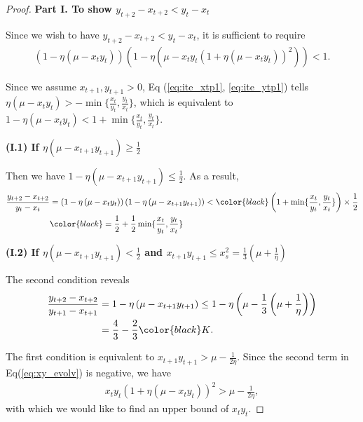 \documentclass{article}
\theoremstyle{plain}
\theoremstyle{remark}
\newcommand{\red}[1]{{\color{black}#1}}
\begin{document}
\begin{proof}
\textbf{Part I. To show $y_{t+2}-x_{t+2}<y_t-x_t$}


Since we wish to have $y_{t+2}-x_{t+2}<y_t-x_t$, it is sufficient to require
\begin{align}
    \left(1-\eta\left(\mu-x_t y_t\right)\right)
    \left(1-\eta\left(\mu-x_t y_t\left(1+\eta\left(\mu-x_t y_t\right)\right)^2\right)\right)<1. \label{eq:xybalance}
\end{align}


\red{
Since we assume $x_{t+1}, y_{t+1}>0$, Eq (\ref{eq:ite_xtp1}, \ref{eq:ite_ytp1}) tells $\eta\left(\mu-x_t y_t\right)>-\min\{\frac{x_t}{y_t}, \frac{y_t}{x_t}\}$, which is equivalent to $1-\eta\left(\mu-x_t y_t\right)<1+\min\{\frac{x_t}{y_t}, \frac{y_t}{x_t}\}$.}

\textbf{(I.1) If $\eta(\mu-x_{t+1}y_{t+1})\ge\frac{1}{2}$}

Then we have $1-\eta(\mu-x_{t+1}y_{t+1})\le\frac{1}{2}$. As a result, 
\begin{align}
    \frac{y_{t+2}-x_{t+2}}{y_t-x_t}&=\left(1-\eta\left(\mu-x_t y_t\right)\right)\left(1-\eta\left(\mu-x_{t+1} y_{t+1}\right)\right)< \red{\left(1+\min\{\frac{x_t}{y_t}, \frac{y_t}{x_t}\}\right)\times\frac{1}{2}} \\
    &\red{=\frac{1}{2}+\frac{1}{2}\min\{\frac{x_t}{y_t}, \frac{y_t}{x_t}\}}
    \label{eq:xydiff_rate1}
\end{align}

\textbf{(I.2) If $\eta(\mu-x_{t+1}y_{t+1})<\frac{1}{2}$ and $x_{t+1} y_{t+1}\le x_s^2=\frac{1}{3}\left(\mu+\frac{1}{\eta}\right)$}

The second condition reveals
\begin{align}
    \frac{y_{t+2}-x_{t+2}}{y_{t+1}-x_{t+1}}
    &=1-\eta\left(\mu-x_{t+1} y_{t+1}\right)
    \le 1-\eta\left(\mu-\frac{1}{3}\left(\mu+\frac{1}{\eta}\right)\right)
    \nonumber
    \\
    &=\frac{4}{3}-\frac{2}{3}\red{K}.
    \label{eq:diff_ratio_t2_bound}
\end{align}

The first condition is equivalent to $x_{t+1} y_{t+1}>\mu-\frac{1}{2\eta}$. Since the second term in Eq(\ref{eq:xy_evolv}) is negative, we have
\begin{align}
    x_t y_t\left(1+\eta\left(\mu-x_t y_t\right)\right)^2>\mu-\frac{1}{2\eta},
    \label{eq:xy_upbound}
\end{align}
with which we would like to find an upper bound of $x_t y_t$.


\end{proof}
\end{document}
